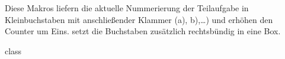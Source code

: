 \begin{macro}{\multiexe}
Diese Makros liefern die aktuelle Nummerierung der Teilaufgabe in Kleinbuchstaben mit anschließender Klammer (a), b),\dots) und erhöhen den Counter um Eins.  setzt die Buchstaben zusätzlich rechtsbündig in eine Box.
\begin{MacroCode}{class}
\DeclareDocumentCommand {} {%
   {
    \multiexelabel*\xspace
  }{
    \multiexelabel\xspace
  }
}

\end{MacroCode}
\end{macro}
